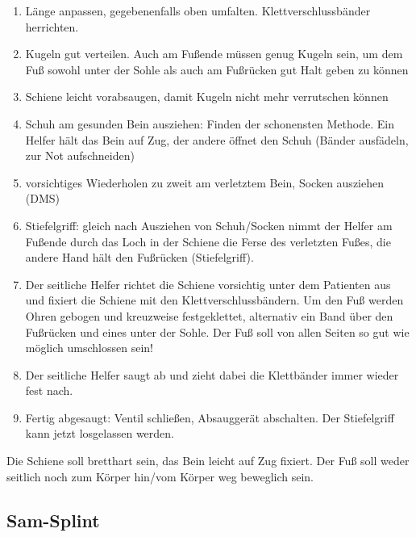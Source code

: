 \begin{enumerate}
    \item Länge anpassen, gegebenenfalls oben umfalten.
    Klettverschlussbänder herrichten.
    \item Kugeln gut verteilen. Auch am Fußende müssen genug Kugeln
    sein, um dem Fuß sowohl unter der Sohle als auch am Fußrücken
    gut Halt geben zu können
    \item Schiene leicht vorabsaugen, damit Kugeln nicht mehr verrutschen
    können
    \item Schuh am gesunden Bein ausziehen: Finden der schonensten Methode.
    Ein Helfer hält das Bein auf Zug, der andere öffnet den Schuh
    (Bänder ausfädeln, zur Not aufschneiden)
    \item vorsichtiges Wiederholen zu zweit am verletztem Bein, Socken
    ausziehen (DMS)
    \item Stiefelgriff: gleich nach Ausziehen von Schuh/Socken nimmt der
    Helfer am Fußende durch das Loch in der Schiene die Ferse des
    verletzten Fußes, die andere Hand hält den Fußrücken (Stiefelgriff).
    \item Der seitliche Helfer richtet die Schiene vorsichtig unter dem
    Patienten aus und fixiert die Schiene mit den Klettverschlussbändern.
    Um den Fuß werden Ohren gebogen und kreuzweise festgeklettet, alternativ ein
    Band über den Fußrücken und eines unter der Sohle. Der Fuß soll von allen
    Seiten so gut wie möglich umschlossen sein!
    \item Der seitliche Helfer saugt ab und zieht dabei die Klettbänder
    immer wieder fest nach. 
    \item Fertig abgesaugt: Ventil schließen, Absauggerät abschalten. Der
    Stiefelgriff kann jetzt losgelassen werden.
\end{enumerate}

Die Schiene soll bretthart sein, das Bein leicht auf Zug fixiert. Der
Fuß soll weder seitlich noch zum Körper hin/vom Körper weg beweglich sein.



\subsection{Sam-Splint}
\label{topic:sam-splint-anwendung}

